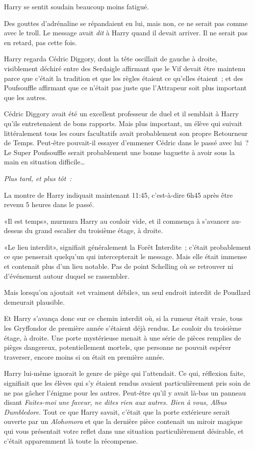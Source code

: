 Harry se sentit soudain beaucoup moins fatigué.

Des gouttes d'adrénaline se répandaient en lui, mais non, ce ne serait pas comme avec le troll. Le message avait \emph{dit} à Harry quand il devait arriver. Il ne serait pas en retard, pas cette fois.

Harry regarda Cédric Diggory, dont la tête oscillait de gauche à droite, visiblement déchiré entre des Serdaigle affirmant que le Vif devait être maintenu parce que c'était la tradition et que les règles étaient ce qu'elles étaient~; et des Poufsouffle affirmant que ce n'était pas juste que l'Attrapeur soit plus important que les autres.

Cédric Diggory avait été un excellent professeur de duel et il semblait à Harry qu'ils entretenaient de bons rapports. Mais plus important, un élève qui suivait littéralement tous les cours facultatifs avait probablement son propre Retourneur de Temps. Peut-être pouvait-il essayer d'emmener Cédric dans le passé avec lui~? Le Super Poufsouffle serait probablement une bonne baguette à avoir sous la main en situation difficile…

\later

\emph{Plus tard, et plus tôt~:}

La montre de Harry indiquait maintenant 11:45, c'est-à-dire 6h45 après être revenu 5 heures dans le passé.

«Il est temps», murmura Harry au couloir vide, et il commença à s'avancer au-dessus du grand escalier du troisième étage, à droite.

«Le lieu interdit», signifiait généralement la Forêt Interdite~; c'était probablement ce que penserait quelqu'un qui intercepterait le message. Mais elle était immense et contenait plus d'un lieu notable. Pas de point Schelling où se retrouver ni d'événement autour duquel se rassembler.

Mais lorsqu'on ajoutait «et vraiment débile», un seul endroit interdit de Poudlard demeurait plausible.

Et Harry s'avança donc sur ce chemin interdit où, si la rumeur était vraie, tous les Gryffondor de première année s'étaient déjà rendus. Le couloir du troisième étage, à droite. Une porte mystérieuse menait à une série de pièces remplies de pièges dangereux, potentiellement mortels, que personne ne pouvait espérer traverser, encore moins si on était en première année.

Harry lui-même ignorait le genre de piège qui l'attendait. Ce qui, réflexion faite, signifiait que les élèves qui s'y étaient rendus avaient particulièrement pris soin de ne pas gâcher l'énigme pour les autres. Peut-être qu'il y avait là-bas un panneau disant \emph{Faites-moi une faveur, ne dites rien aux autres. Bien à vous, Albus Dumbledore}. Tout ce que Harry savait, c'était que la porte extérieure serait ouverte par un \emph{Alohomora} et que la dernière pièce contenait un miroir magique qui vous présentait votre reflet dans une situation particulièrement désirable, et c'était apparemment là toute la récompense.

